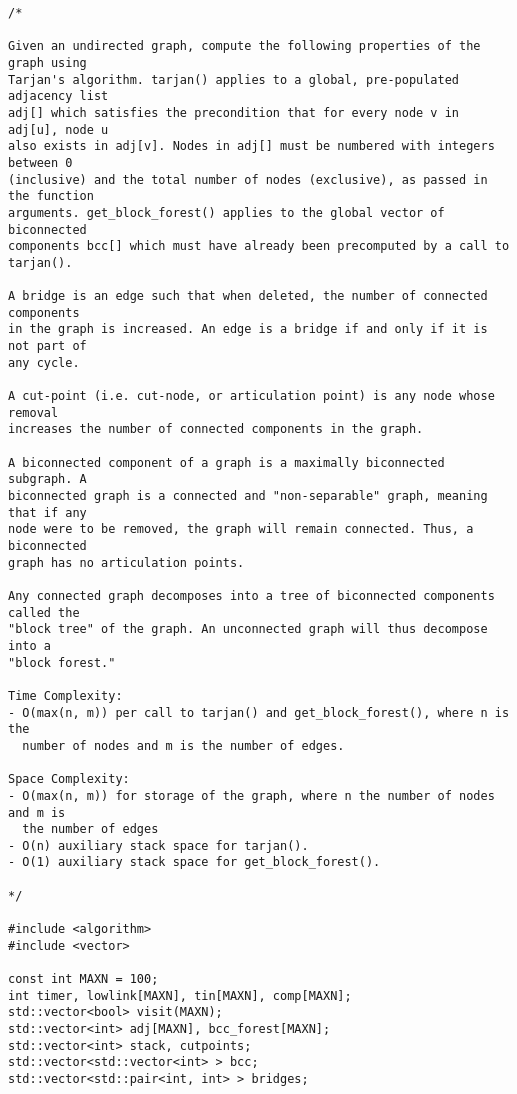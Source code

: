 \begin{lstlisting}
/*

Given an undirected graph, compute the following properties of the graph using
Tarjan's algorithm. tarjan() applies to a global, pre-populated adjacency list
adj[] which satisfies the precondition that for every node v in adj[u], node u
also exists in adj[v]. Nodes in adj[] must be numbered with integers between 0
(inclusive) and the total number of nodes (exclusive), as passed in the function
arguments. get_block_forest() applies to the global vector of biconnected
components bcc[] which must have already been precomputed by a call to tarjan().

A bridge is an edge such that when deleted, the number of connected components
in the graph is increased. An edge is a bridge if and only if it is not part of
any cycle.

A cut-point (i.e. cut-node, or articulation point) is any node whose removal
increases the number of connected components in the graph.

A biconnected component of a graph is a maximally biconnected subgraph. A
biconnected graph is a connected and "non-separable" graph, meaning that if any
node were to be removed, the graph will remain connected. Thus, a biconnected
graph has no articulation points.

Any connected graph decomposes into a tree of biconnected components called the
"block tree" of the graph. An unconnected graph will thus decompose into a
"block forest."

Time Complexity:
- O(max(n, m)) per call to tarjan() and get_block_forest(), where n is the
  number of nodes and m is the number of edges.

Space Complexity:
- O(max(n, m)) for storage of the graph, where n the number of nodes and m is
  the number of edges
- O(n) auxiliary stack space for tarjan().
- O(1) auxiliary stack space for get_block_forest().

*/

#include <algorithm>
#include <vector>

const int MAXN = 100;
int timer, lowlink[MAXN], tin[MAXN], comp[MAXN];
std::vector<bool> visit(MAXN);
std::vector<int> adj[MAXN], bcc_forest[MAXN];
std::vector<int> stack, cutpoints;
std::vector<std::vector<int> > bcc;
std::vector<std::pair<int, int> > bridges;


\end{lstlisting}
